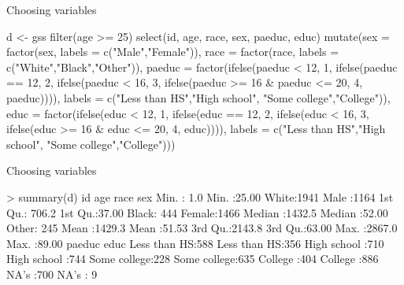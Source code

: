 \documentclass{beamer}
\newcommand\blue[1]{{\color{blue}#1}}
\begin{document}
\begin{frame}[fragile]{Choosing variables}
\scriptsize
\begin{semiverbatim}
d <- gss %
  filter(age >= 25) %
  select(id, age, race, sex,
         paeduc, educ) %
  mutate(sex = factor(sex, labels = c("Male","Female")),
         race = factor(race, labels = c("White","Black","Other")),
         paeduc = factor(ifelse(paeduc < 12, 1,
                                ifelse(paeduc == 12, 2,
                                       ifelse(paeduc < 16, 3,
                                              ifelse(paeduc >= 16 & paeduc <= 20, 4,
                                                     paeduc)))),
                         labels = c("Less than HS","High school",
                                    "Some college","College")),
         educ = factor(ifelse(educ < 12, 1,
                              ifelse(educ == 12, 2,
                                     ifelse(educ < 16, 3,
                                            ifelse(educ >= 16 & educ <= 20, 4,
                                                   educ)))),
                       labels = c("Less than HS","High school",
                                  "Some college","College")))
\end{semiverbatim}
\end{frame}

\begin{frame}[fragile]{Choosing variables}
\footnotesize
\begin{semiverbatim}
> summary(d)
       id              age           race          sex      
 Min.   :   1.0   Min.   :25.00   White:1941   Male  :1164  
 1st Qu.: 706.2   1st Qu.:37.00   Black: 444   Female:1466  
 Median :1432.5   Median :52.00   Other: 245                
 Mean   :1429.3   Mean   :51.53                             
 3rd Qu.:2143.8   3rd Qu.:63.00                             
 Max.   :2867.0   Max.   :89.00                             
          paeduc              educ    
 Less than HS:588   Less than HS:356  
 High school :710   High school :744  
 Some college:228   Some college:635  
 College     :404   College     :886  
 NA's        :700   NA's        :  9                            
\end{semiverbatim}
\end{frame}

\end{document}
